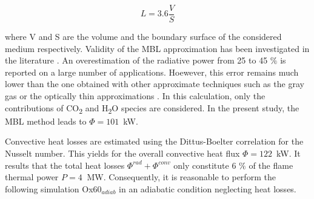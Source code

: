\documentclass[twocolumn,10pt]{asme2e}
\begin{document}
\begin{equation}\label{eq:MBL}
L = 3.6 \frac{V}{S}
\end{equation}


where V and S are the volume and the boundary surface of the considered medium respectively. Validity of the MBL approximation has been investigated in the literature \cite{doi:10.1080/00102207408960365,edwards1973thermal}. An overestimation of the radiative power from 25 to 45 $\%$  is reported on a large number of applications. Hoewever, this error remains much lower than the one obtained with other approximate techniques such as the gray gas or the optically thin approximations \cite{doi:10.1080/00102207408960365}. In this calculation, only the contributions of CO\textsubscript{2} and H\textsubscript{2}O species are considered. In the present study, the MBL method leads to $\Phi =101$~kW.

Convective heat losses are estimated using the Dittus-Boelter correlation \cite{xuan2003investigation} for the Nusselt number. This yields for the overall convective heat flux $\Phi=122$~kW. It results that the total heat losses $\Phi^{rad} + \Phi^{conv}$ only constitute 6 $\%$ of the flame thermal power $P=4~$ MW. Consequently, it is reasonable to perform the following simulation Ox60$_{adiab}$ in an adiabatic condition neglecting heat losses.
\end{document}
